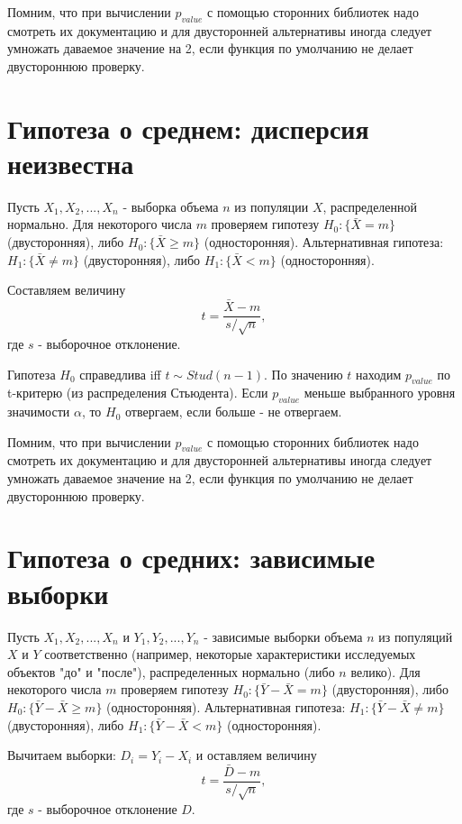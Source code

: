 Помним, что при вычислении $p_{value}$ с помощью сторонних библиотек надо смотреть их документацию и для двусторонней альтернативы иногда следует умножать даваемое значение на 2, если функция по умолчанию не делает двустороннюю проверку. 


\section{Гипотеза о среднем: дисперсия неизвестна}

Пусть $X_1, X_2, ..., X_n$ - выборка объема $n$ из популяции $X$, распределенной нормально.
Для некоторого числа $m$ проверяем гипотезу $H_0: \{ \bar{X} = m \}$ (двусторонняя), либо $H_0: \{ \bar{X} \geqslant m \}$ (односторонняя). 
Альтернативная гипотеза: $H_1: \{ \bar{X} \neq m \}$ (двусторонняя), либо $H_1: \{ \bar{X} < m \}$ (односторонняя). 

Составляем величину
$$
t = \frac{\bar{X} - m}{s/\sqrt{n}},
$$
где $s$ - выборочное отклонение.

Гипотеза $H_0$ справедлива iff $t \sim Stud(n - 1)$. По значению $t$ находим $p_{value}$ по t-критерю (из распределения Стьюдента). Если $p_{value}$ меньше выбранного уровня значимости $\alpha$, то $H_0$ отвергаем, если больше - не отвергаем.

Помним, что при вычислении $p_{value}$ с помощью сторонних библиотек надо смотреть их документацию и для двусторонней альтернативы иногда следует умножать даваемое значение на 2, если функция по умолчанию не делает двустороннюю проверку. 


\section{Гипотеза о средних: зависимые выборки}

Пусть $X_1, X_2, ..., X_n$ и $Y_1, Y_2, ..., Y_n$ - зависимые выборки объема $n$ из популяций $X$ и $Y$ соответственно (например, некоторые характеристики исследуемых объектов "до" и "после"), распределенных нормально (либо $n$ велико).
Для некоторого числа $m$ проверяем гипотезу $H_0: \{ \bar{Y} - \bar{X} = m \}$ (двусторонняя), либо $H_0: \{ \bar{Y} - \bar{X} \geqslant m \}$ (односторонняя). 
Альтернативная гипотеза: $H_1: \{ \bar{Y} - \bar{X} \neq m \}$ (двусторонняя), либо $H_1: \{ \bar{Y} - \bar{X} < m \}$ (односторонняя). 

Вычитаем выборки: $D_i = Y_i - X_i$ и оставляем величину
$$
t = \frac{\bar{D} - m}{s/\sqrt{n}},
$$
где $s$ - выборочное отклонение $D$.

